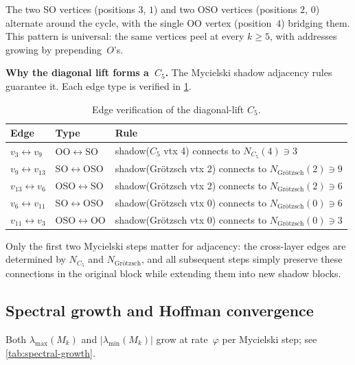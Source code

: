 \documentclass[11pt,a4paper]{amsart}
\theoremstyle{plain}
\theoremstyle{definition}
\theoremstyle{remark}
\newcommand{\vp}{\varphi}
\begin{document}
The two SO vertices (positions $3$, $1$) and two OSO vertices (positions $2$,
$0$) alternate around the cycle, with the single OO vertex (position~$4$)
bridging them.  This pattern is universal: the same vertices peel at every
$k \geq 5$, with addresses growing by prepending~$O$'s.

\medskip\noindent
\textbf{Why the diagonal lift forms a~$C_5$.}
The Mycielski shadow adjacency rules guarantee it.  Each edge type is verified
in \cref{tab:edge-verify}.

\begin{table}[ht]
\centering
\caption{Edge verification of the diagonal-lift $C_5$.}
\label{tab:edge-verify}
\begin{tabular}{lll}
\toprule
Edge & Type & Rule \\
\midrule
$v_3 \leftrightarrow v_9$ & OO$\leftrightarrow$SO
  & shadow($C_5$ vtx 4) connects to $N_{C_5}(4) \ni 3$ \\
$v_9 \leftrightarrow v_{13}$ & SO$\leftrightarrow$OSO
  & shadow(Gr\"otzsch vtx 2) connects to $N_{\text{Gr\"otzsch}}(2) \ni 9$ \\
$v_{13} \leftrightarrow v_6$ & OSO$\leftrightarrow$SO
  & shadow(Gr\"otzsch vtx 2) connects to $N_{\text{Gr\"otzsch}}(2) \ni 6$ \\
$v_6 \leftrightarrow v_{11}$ & SO$\leftrightarrow$OSO
  & shadow(Gr\"otzsch vtx 0) connects to $N_{\text{Gr\"otzsch}}(0) \ni 6$ \\
$v_{11} \leftrightarrow v_3$ & OSO$\leftrightarrow$OO
  & shadow(Gr\"otzsch vtx 0) connects to $N_{\text{Gr\"otzsch}}(0) \ni 3$ \\
\bottomrule
\end{tabular}
\end{table}

Only the first two Mycielski steps matter for adjacency: the cross-layer edges
are determined by $N_{C_5}$ and $N_{\text{Gr\"otzsch}}$, and all subsequent
steps simply preserve these connections in the original block while extending
them into new shadow blocks.

\subsection{Spectral growth and Hoffman convergence}\label{ssec:spectral-growth}

Both $\lambda_{\max}(M_k)$ and $|\lambda_{\min}(M_k)|$ grow at rate~$\vp$ per
Mycielski step; see \cref{tab:spectral-growth}.
\end{document}
